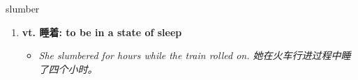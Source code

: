 
\begin{frame}
{\huge slumber}
\begin{center}
\begin{enumerate}\Large
  \item \textbf{vt. 睡着: to be in a state of sleep}
  \begin{itemize}
    \item \em{\Large{She slumbered for hours while the train rolled on. 她在火车行进过程中睡了四个小时。}}
  \end{itemize}
\end{enumerate}
\end{center}
\end{frame}
